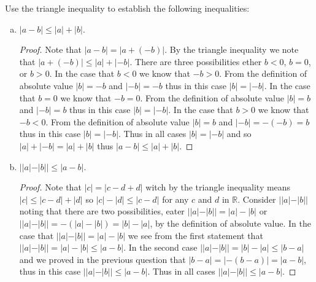 \documentclass[12pt]{article}
\makeatletter
\theoremstyle{homework}
\newenvironment{exercise}[1]
{\def\@currentlabel{#1}\exercisecore}
{\endexercisecore}
\makeatother
\begin{document}
\begin{exercise}{1.2.5}
Use the triangle inequality to establish the following inequalities:
\end{exercise}
\begin{enumerate}[(a)]
\item $|a-b| \le |a| + |b|$.
\begin{proof}
Note that $|a-b|=|a+(-b)|$.  By the triangle inequality we note that $|a+(-b)| \le |a|+|-b|$.  There are three possibilities ether $b< 0$, $b=0$, or $b> 0$.  In the case that $b< 0$ we know that $-b>0$.  From the definition of absolute value $|b|=-b$ and $|-b|=-b$ thus in this case $|b|=|-b|$.  In the case that $b= 0$ we know that $-b=0$.  From the definition of absolute value $|b|=b$ and $|-b|=b$ thus in this case $|b|=|-b|$.  In the case that $b> 0$ we know that $-b<0$.  From the definition of absolute value $|b|=b$ and $|-b|=-(-b)=b$ thus in this case $|b|=|-b|$.  Thus in all cases $|b|=|-b|$ and so $|a|+|-b|=|a|+|b|$ thus $|a-b|\le |a|+|b|$.
\end{proof}
\item $||a|-|b|| \le |a-b|$.
\begin{proof}
Note that $|c|=|c-d+d|$ witch by the triangle inequality means $|c|\le |c-d|+|d|$ so $|c|-|d|\le |c-d|$ for any $c$ and $d$ in $\mathbb{R}$.  Consider $||a|-|b||$ noting that there are two possibilities, eater $||a|-|b||=|a|-|b|$ or $||a|-|b||=-(|a|-|b|)=|b|-|a|$, by the definition of absolute value.  In the case that $||a|-|b||=|a|-|b|$ we see from the first statement that $||a|-|b||=|a|-|b| \le |a-b|$.  In the second case $||a|-|b||=|b|-|a|\le |b-a|$ and we proved in the previous question that $|b-a|=|-(b-a)|=|a-b|$, thus in this case $||a|-|b||\le |a-b|$.  Thus in all cases $||a|-|b||\le |a-b|$.
\end{proof}
\end{enumerate}
\end{document}
